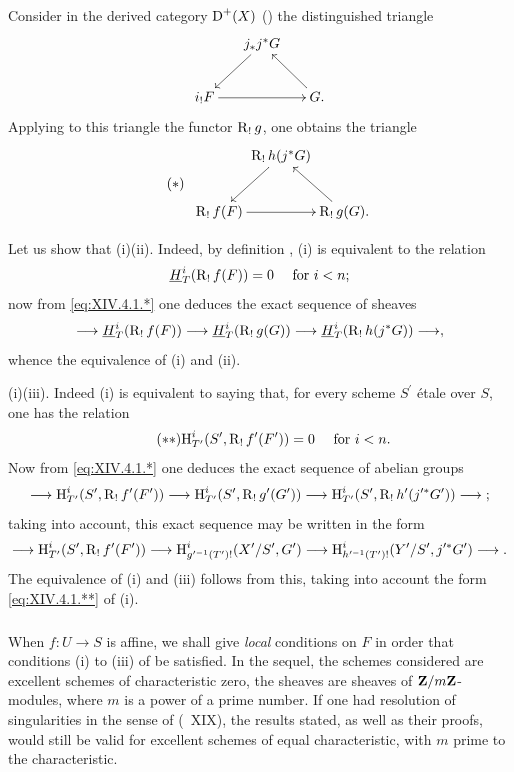 Consider in the derived category $\operatorname{D}^{+}(X)$ (\cf \cite{XIV.3}) the distinguished triangle
$$
\xymatrix@C=15pt{ & j_{\ast}j^{\ast}G\ar[ld] & \\
i_{!}F\ar[rr] & & G.\ar[lu]}$$
Applying to this triangle the functor $\operatorname{R}_{!}g$, one obtains the triangle
\begin{equation*} \label{eq:XIV.4.1.*} \tag{$*$}
\begin{array}{c}
\xymatrix@C=0pt{
& \R_{!}h(j^{\ast}G)\ar[ld] & \\
\R_{!}f(F)\ar[rr] & & \R_{!}g(G).\ar[lu]
}
\end{array}
\end{equation*}

Let us show that \textup{(i)}\SSI\textup{(ii)}. Indeed, by definition , \textup{(i)} is equivalent to the relation
$$
\underline{H}_{T}^{i}(\operatorname{R}_{!}f(F))=0\quad\textrm{ for }i<n\textrm{;}$$
now from \eqref{eq:XIV.4.1.*} one deduces the exact sequence of sheaves
$$
\to\underline{H}_{T}^{i}(\R_{!}f(F))\to\underline{H}_{T}^{i}(\R_{!}g(G))\to\underline{H}_{T}^{i}(\R_{!}h(j^{\ast}G))\to,
$$
whence the equivalence of \textup{(i)} and \textup{(ii)}.

\textup{(i)}\SSI\textup{(iii)}. Indeed \textup{(i)} is equivalent to saying that, for every scheme $S^{\prime}$ \'etale over $S$, one has the relation
\begin{equation*} \label{eq:XIV.4.1.**} \tag{$**$} {\operatorname{H}_{T^{\prime}}^{i}(S^{\prime}, \operatorname{R}_{!}f^{\prime}(F^{\prime}))=0\quad\textrm{ for }i<n.}
\end{equation*}
Now from \eqref{eq:XIV.4.1.*} one deduces the exact sequence of abelian groups
$$
\to\H_{T^{\prime}}^{i}(S^{\prime}, \R_{!}f^{\prime}(F^{\prime}))\to\H_{T^{\prime}}^{i}(S^{\prime}, \R_{!}g^{\prime}(G^{\prime}))\to \H_{T^{\prime}}^{i}(S^{\prime}, \R_{!}h^{\prime}(j^{\prime\ast}G^{\prime}))\to\;;$$
taking  into account, this exact sequence may be written in the form
$$
\to\H_{T^{\prime}}^{i}(S^{\prime}, \R_{!}f^{\prime}(F^{\prime}))\to\H_{g^{\prime -1}(T^{\prime})!}^{i}(X^{\prime}/S^{\prime}, G^{\prime})\to\H_{h^{\prime -1}(T^{\prime})!}^{i}(Y^{\prime}/S^{\prime}, j^{\prime\ast}G^{\prime})\to.$$
The equivalence of \textup{(i)} and \textup{(iii)} follows from this, taking into account the form \eqref{eq:XIV.4.1.**} of \textup{(i)}.

\setcounter{subsubsection}{-1} \setcounter{subsection}{2}

\subsubsection{} \label{XIV.4.2.0}
When $f\colon U\to S$ is affine, we shall give \emph{local} conditions on $F$ in order that conditions \textup{(i)} to \textup{(iii)} of  be satisfied. In the sequel, the schemes considered are excellent schemes of characteristic zero, the sheaves are sheaves of $\mathbf{Z}/m\mathbf{Z}$-modules, where $m$ is a power of a prime number. If one had resolution of singularities in the sense of (~XIX), the results stated, as well as their proofs, would still be valid for excellent schemes of equal characteristic, with $m$ prime to the characteristic.

